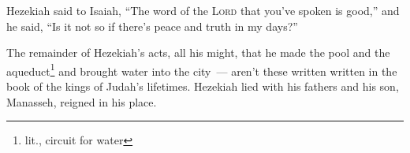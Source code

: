 \begin{inparaenum}
     Hezekiah said to Isaiah, ``The word of the \textsc{Lord} that you've spoken is good,'' and he said, ``Is it not so if there's peace and truth in my days?''%
    
     The remainder of Hezekiah's acts, all his might, that he made the pool and the aqueduct\footnote{lit., circuit for water} and brought water into the city~--- aren't these written written in the book of the kings of Judah's lifetimes.%
     Hezekiah lied with his fathers and his son, Manasseh, reigned in his place.%
\end{inparaenum}
